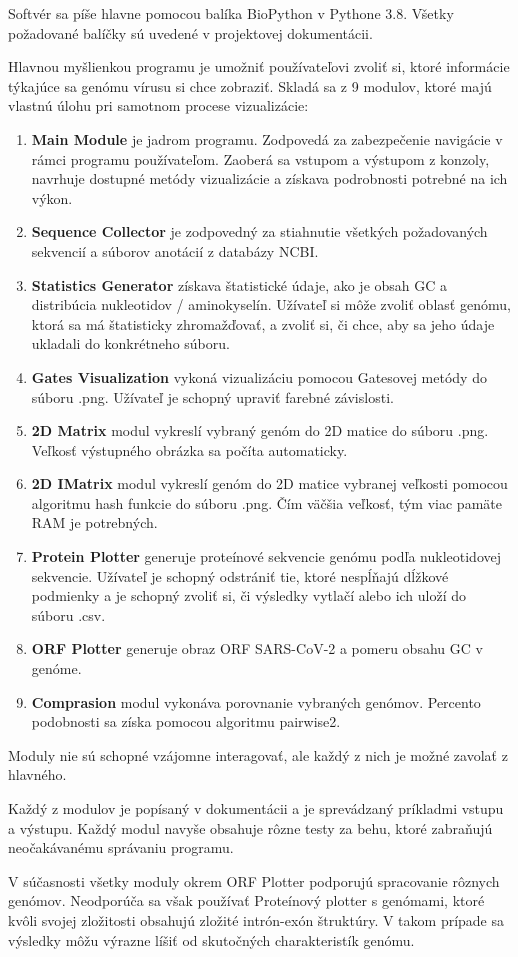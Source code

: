 Softvér sa píše hlavne pomocou balíka BioPython v Pythone 3.8.
Všetky požadované balíčky sú uvedené v projektovej dokumentácii.

Hlavnou myšlienkou programu je umožniť používateľovi zvoliť si, ktoré informácie týkajúce sa genómu vírusu si chce zobraziť.
Skladá sa z 9 modulov, ktoré majú vlastnú úlohu pri samotnom procese vizualizácie:
\begin{enumerate}
    \item \textbf{Main Module} je jadrom programu. Zodpovedá za zabezpečenie navigácie v rámci programu používateľom.
    Zaoberá sa vstupom a výstupom z konzoly, navrhuje dostupné metódy vizualizácie a získava podrobnosti potrebné na ich výkon.
    \item \textbf{Sequence Collector} je zodpovedný za stiahnutie všetkých požadovaných sekvencií a súborov anotácií z databázy NCBI.
    \item \textbf{Statistics Generator} získava štatistické údaje, ako je obsah GC a distribúcia nukleotidov / aminokyselín.
    Užívateľ si môže zvoliť oblasť genómu, ktorá sa má štatisticky zhromažďovať, a zvoliť si, či chce, aby sa jeho údaje ukladali do konkrétneho súboru.
    \item \textbf{Gates Visualization} vykoná vizualizáciu pomocou Gatesovej metódy do súboru .png.
    Užívateľ je schopný upraviť farebné závislosti.
    \item \textbf{2D Matrix} modul vykreslí vybraný genóm do 2D matice do súboru .png. Veľkosť výstupného obrázka sa počíta automaticky.
    \item \textbf{2D IMatrix} modul vykreslí genóm do 2D matice vybranej veľkosti pomocou algoritmu hash funkcie do súboru .png.
    Čím väčšia veľkosť, tým viac pamäte RAM je potrebných.
    \item \textbf{Protein Plotter} generuje proteínové sekvencie genómu podľa nukleotidovej sekvencie.
    Užívateľ je schopný odstrániť tie, ktoré nespĺňajú dĺžkové podmienky a je schopný zvoliť si, či výsledky vytlačí alebo ich uloží do súboru .csv.
    \item \textbf{ORF Plotter} generuje obraz ORF SARS-CoV-2 a pomeru obsahu GC v genóme.
    \item \textbf{Comprasion} modul vykonáva porovnanie vybraných genómov. Percento podobnosti sa získa pomocou algoritmu pairwise2.
\end{enumerate}

Moduly nie sú schopné vzájomne interagovať, ale každý z nich je možné zavolať z hlavného.

Každý z modulov je popísaný v dokumentácii a je sprevádzaný príkladmi vstupu a výstupu.
Každý modul navyše obsahuje rôzne testy za behu, ktoré zabraňujú neočakávanému správaniu programu.

V súčasnosti všetky moduly okrem ORF Plotter podporujú spracovanie rôznych genómov.
Neodporúča sa však používať Proteínový plotter s genómami, ktoré kvôli svojej zložitosti obsahujú zložité intrón-exón štruktúry.
V takom prípade sa výsledky môžu výrazne líšiť od skutočných charakteristík genómu.